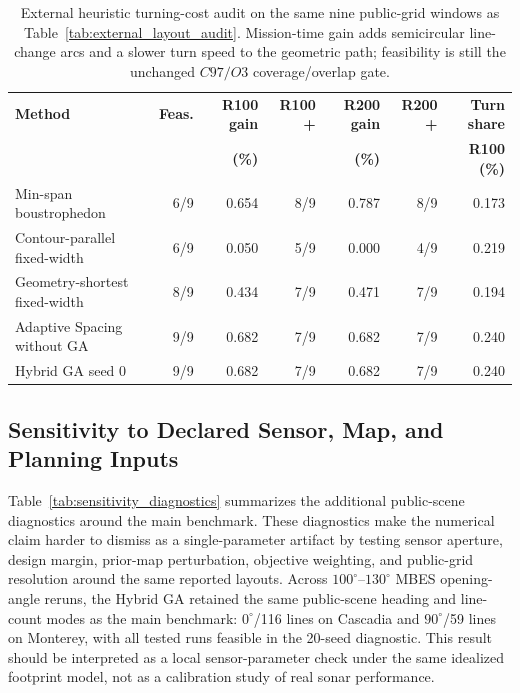 \documentclass[jmse,article,submit,moreauthors]{Definitions/mdpi}
\begin{document}
\begin{table}[!htbp]
	\centering
	\caption{External heuristic turning-cost audit on the same nine public-grid windows as Table~\ref{tab:external_layout_audit}. Mission-time gain adds semicircular line-change arcs and a slower turn speed to the geometric path; feasibility is still the unchanged \(C97/O3\) coverage/overlap gate.}
	\label{tab:external_turning_cost_audit}
	\scriptsize
	\renewcommand{\arraystretch}{1.12}
	\setlength{\tabcolsep}{4.2pt}
	\begin{tabular}{@{}lrrrrrr@{}}
		\toprule[1bp]
		\textbf{Method} & \textbf{Feas.} & \textbf{R100 gain} & \textbf{R100 +} & \textbf{R200 gain} & \textbf{R200 +} & \textbf{Turn share} \\
		& & \textbf{(\%)} & & \textbf{(\%)} & & \textbf{R100 (\%)} \\
		\midrule[1bp]
		Min-span boustrophedon & 6/9 & 0.654 & 8/9 & 0.787 & 8/9 & 0.173 \\
		Contour-parallel fixed-width & 6/9 & 0.050 & 5/9 & 0.000 & 4/9 & 0.219 \\
		Geometry-shortest fixed-width & 8/9 & 0.434 & 7/9 & 0.471 & 7/9 & 0.194 \\
		Adaptive Spacing without GA & 9/9 & 0.682 & 7/9 & 0.682 & 7/9 & 0.240 \\
		Hybrid GA seed 0 & 9/9 & 0.682 & 7/9 & 0.682 & 7/9 & 0.240 \\
		\bottomrule[1bp]
	\end{tabular}
\end{table}

\subsection{Sensitivity to Declared Sensor, Map, and Planning Inputs}
Table~\ref{tab:sensitivity_diagnostics} summarizes the additional public-scene diagnostics around the main benchmark. These diagnostics make the numerical claim harder to dismiss as a single-parameter artifact by testing sensor aperture, design margin, prior-map perturbation, objective weighting, and public-grid resolution around the same reported layouts. Across \(100^{\circ}\)--\(130^{\circ}\) MBES opening-angle reruns, the Hybrid GA retained the same public-scene heading and line-count modes as the main benchmark: \(0^{\circ}\)/116 lines on Cascadia and \(90^{\circ}\)/59 lines on Monterey, with all tested runs feasible in the 20-seed diagnostic. This result should be interpreted as a local sensor-parameter check under the same idealized footprint model, not as a calibration study of real sonar performance.
\end{document}
